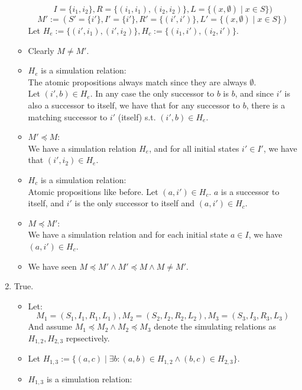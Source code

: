 \documentclass{article}
\begin{document}
\begin{enumerate}[label=\alph*.]
\begin{itemize}
\[                I=\{i_1,i_2\},
                R=\{(i_1,i_1), (i_2,i_2)\},
                L=\{(x,\emptyset)\mid x\in S\}
            )
        \]
        \[
            M':=(
                S'=\{i'\},
                I'=\{i'\},
                R'=\{(i',i')\},
                L'=\{(x,\emptyset)\mid x\in S\}
            )
        \]
        Let $H_e:=\{(i',i_1), (i',i_2)\}, H_c:=\{(i_1,i'), (i_2,i')\}$.
        \item Clearly $M\neq M'$.
        \item $H_e$ is a simulation relation:\\
        The atomic propositions always match since they are always $\emptyset$.\\
        Let $(i',b)\in H_e$. In any case the only successor to $b$ is $b$,
        and since $i'$ is also a successor to itself, we have that for any successor to $b$,
        there is a matching successor to $i'$ (itself) s.t. $(i',b)\in H_e$.\\
        \item $M'\preceq M$:\\
        We have a simulation relation $H_e$,
        and for all initial states $i'\in I'$, we have that $(i',i_2)\in H_e$.
        \item $H_c$ is a simulation relation:\\
        Atomic propositions like before.
        Let $(a,i')\in H_c$. $a$ is a successor to itself,
        and $i'$ is the only successor to itself and $(a,i')\in H_c$.
        \item $M\preceq M'$:\\
        We have a simulation relation and for each initial state $a\in I$,
        we have $(a,i')\in H_c$.
        \item We have seen $M\preceq M'\wedge M'\preceq M\wedge M\neq M'$.
    \end{itemize}
    \item True.
    \begin{itemize}
        \item 
        Let:
        $$
            M_1=(S_1,I_1,R_1,L_1),
            M_2=(S_2,I_2,R_2,L_2),
            M_3=(S_3,I_3,R_3,L_3)
        $$
        And assume $M_1\preceq M_2\wedge M_2\preceq M_3$ denote the simulating
        relations as $H_{1,2}, H_{2,3}$ repsectively.
        \item Let $H_{1,3}:=\{(a,c)\mid \exists b: (a,b)\in H_{1,2}\wedge (b,c)\in H_{2,3}\}$.
        \item $H_{1,3}$ is a simulation relation:\\

\end{itemize}
\end{enumerate}
\end{document}
